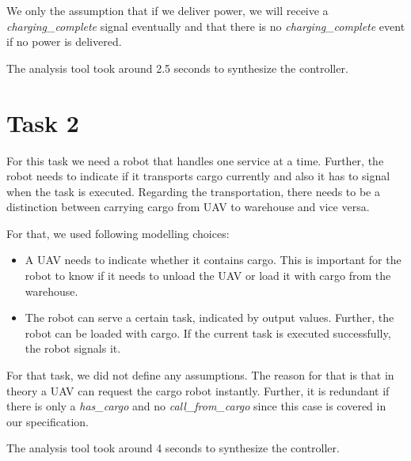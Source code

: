 \documentclass[	runningheads,
    a4paper]{llncs}
\begin{document}
    We only the assumption that if we deliver power, we will receive a \textit{charging\_complete} signal eventually and that there is no \textit{charging\_complete} event if no power is delivered.


    The analysis tool took around 2.5 seconds to synthesize the controller.



    \section*{Task 2}

    For this task we need a robot that handles one service at a time. Further, the robot needs to indicate if it transports cargo currently and also it has to signal when the task is executed. Regarding the transportation, there needs to be a distinction between carrying cargo from UAV to warehouse and vice versa.

    For that, we used following modelling choices:

    \begin{itemize}
        \item A UAV needs to indicate whether it contains cargo. This is important for the robot to know if it needs to unload the UAV or load it with cargo from the warehouse.
        \item The robot can serve a certain task, indicated by output values. Further, the robot can be loaded with cargo. If the current task is executed successfully, the robot signals it.
    \end{itemize}

    For that task, we did not define any assumptions. The reason for that is that in theory a UAV can request the cargo robot instantly. Further, it is redundant if there is only a \textit{has\_cargo} and no \textit{call\_from\_cargo} since this case is covered in our specification.




    The analysis tool took around 4 seconds to synthesize the controller.

\end{document}
